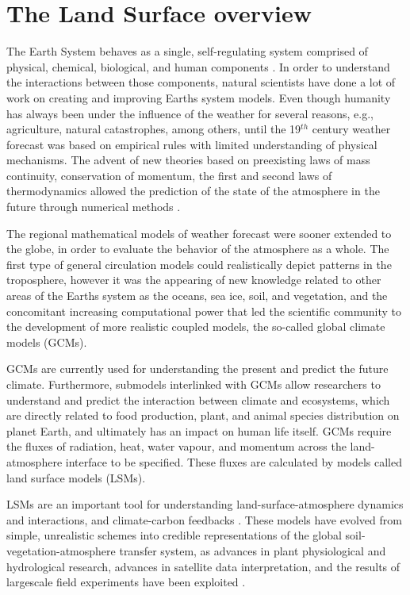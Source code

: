 \section{The Land Surface overview}\label{introduction}

The Earth System behaves as a single, self-regulating system comprised of physical, chemical, biological, and human components \citep{Pronk2002}. In order to understand the interactions between those components, natural scientists have done a lot of work on creating and improving Earth\textquotesingle s system models. Even though humanity has always been under the influence of the weather for several reasons, e.g., agriculture, natural catastrophes, among others, until the 19$^{th}$ century weather forecast was based on empirical rules with limited understanding of physical mechanisms. The advent of new theories based on preexisting laws of mass continuity, conservation of momentum, the first and second laws of thermodynamics allowed the prediction of the state of the atmosphere in the future through numerical methods \citep{Lynch2008}.

The regional mathematical models of weather forecast were sooner extended to the globe, in order to evaluate the behavior of the atmosphere as a whole. The first type of general circulation models could realistically depict patterns in the troposphere, however it was the appearing of new knowledge related to other areas of the Earth\textquotesingle s system as the oceans, sea ice, soil, and vegetation, and the concomitant increasing computational power that led the scientific community to the development of more realistic coupled models, the so-called global climate models (GCMs).

GCMs are currently used for understanding the present and predict the future climate. Furthermore, submodels interlinked with GCMs allow researchers to understand and predict the interaction between climate and ecosystems, which are directly related to food production, plant, and animal species distribution on planet Earth, and ultimately has an impact on human life itself. GCMs require the fluxes of radiation, heat, water vapour, and momentum across the land-atmosphere interface to be specified. These fluxes are calculated by models called land surface models (LSMs). 

LSMs are an important tool for understanding land-surface-atmosphere dynamics and interactions, and climate-carbon feedbacks \citep{loew2014}. These models have evolved from simple, unrealistic schemes into credible representations of the global soil-vegetation-atmosphere transfer system, as advances in plant physiological and hydrological research, advances in satellite data interpretation, and the results of largescale field experiments have been exploited \citep{Sellers1997}.

